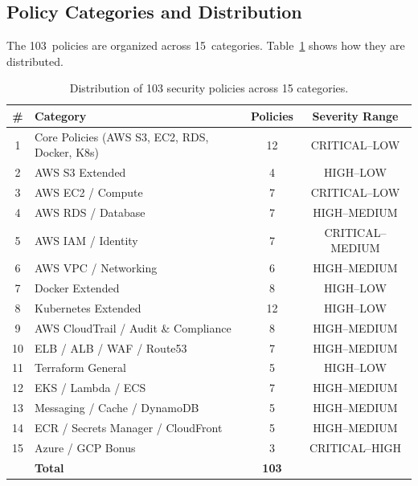 \subsection{Policy Categories and Distribution}

The 103~policies are organized across 15~categories. Table~\ref{tab:policy-categories} shows how they are distributed.

\begin{table}[H]
\centering
\begin{tabular}{|c|l|c|c|}
\hline
\textbf{\#} & \textbf{Category} & \textbf{Policies} & \textbf{Severity Range} \\
\hline
1  & Core Policies (AWS S3, EC2, RDS, Docker, K8s) & 12 & CRITICAL--LOW \\
\hline
2  & AWS S3 Extended                               &  4 & HIGH--LOW \\
\hline
3  & AWS EC2 / Compute                             &  7 & CRITICAL--LOW \\
\hline
4  & AWS RDS / Database                            &  7 & HIGH--MEDIUM \\
\hline
5  & AWS IAM / Identity                            &  7 & CRITICAL--MEDIUM \\
\hline
6  & AWS VPC / Networking                          &  6 & HIGH--MEDIUM \\
\hline
7  & Docker Extended                               &  8 & HIGH--LOW \\
\hline
8  & Kubernetes Extended                           & 12 & HIGH--LOW \\
\hline
9  & AWS CloudTrail / Audit \& Compliance           &  8 & HIGH--MEDIUM \\
\hline
10 & ELB / ALB / WAF / Route53                     &  7 & HIGH--MEDIUM \\
\hline
11 & Terraform General                             &  5 & HIGH--LOW \\
\hline
12 & EKS / Lambda / ECS                            &  7 & HIGH--MEDIUM \\
\hline
13 & Messaging / Cache / DynamoDB                  &  5 & HIGH--MEDIUM \\
\hline
14 & ECR / Secrets Manager / CloudFront            &  5 & HIGH--MEDIUM \\
\hline
15 & Azure / GCP Bonus                             &  3 & CRITICAL--HIGH \\
\hline
   & \textbf{Total}                                & \textbf{103} & \\
\hline
\end{tabular}
\caption{Distribution of 103 security policies across 15 categories.}
\label{tab:policy-categories}
\end{table}

